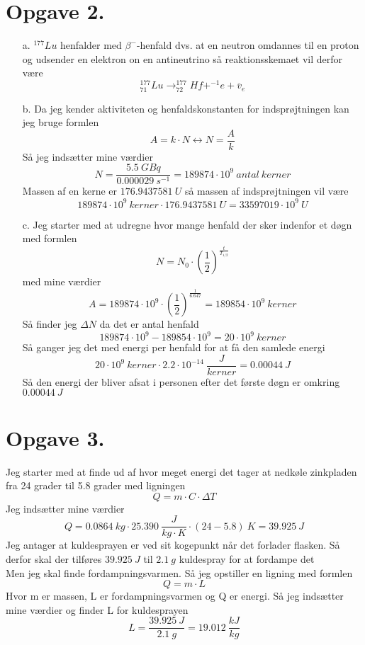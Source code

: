 \documentclass[12pt]{article}
\begin{document}
\section*{Opgave 2.}
\begin{enumerate}
  \item[a.] $^{177}Lu$ henfalder med $\beta ^{-}$-henfald dvs. at en neutron omdannes til en proton og udsender en elektron on en antineutrino
  så reaktionsskemaet vil derfor være
  $$_{71}^{177}Lu \rightarrow _{72}^{177}Hf + ^{-1}e + \overline{v}_{e}$$

  \item[b.] Da jeg kender aktiviteten og henfaldskonstanten for indsprøjtningen kan jeg bruge formlen
  $$A = k \cdot N \leftrightarrow N = \frac{A}{k}$$
  Så jeg indsætter mine værdier
  $$N = \frac{5.5 \ GBq}{0.000029 \ s^{-1}} = 189874 \cdot 10^{9} \ antal \ kerner$$
  Massen af en kerne er $176.9437581 \ U$ så massen af indsprøjtningen vil være
  $$189874 \cdot 10^{9} \ kerner \cdot 176.9437581 \ U = 33597019 \cdot 10^{9} \ U$$

  \item[c.] Jeg starter med at udregne hvor mange henfald der sker indenfor et døgn med formlen
  $$N = N_0 \cdot \left( \frac{1}{2} \right)^{\frac{t}{T_{1/2}}}$$
  med mine værdier
  $$A = 189874 \cdot 10^{9} \cdot \left( \frac{1}{2} \right)^{\frac{1}{6.647}} = 189854 \cdot 10^{9} \ kerner$$
  Så finder jeg $\Delta N$ da det er antal henfald
  $$189874 \cdot 10^{9} - 189854 \cdot 10^{9} = 20 \cdot 10^{9} \ kerner$$
  Så ganger jeg det med energi per henfald for at få den samlede energi
  $$20 \cdot 10^{9} \ kerner \cdot 2.2 \cdot 10^{-14} \ \frac{J}{kerner} = 0.00044 \ J$$
  Så den energi der bliver afsat i personen efter det første døgn er omkring $0.00044 \ J$
\end{enumerate}

\section*{Opgave 3.} Jeg starter med at finde ud af hvor meget energi det tager at nedkøle zinkpladen fra 24 grader til 5.8 grader med ligningen
$$Q=m \cdot C \cdot \Delta T$$
Jeg indsætter mine værdier
$$Q = 0.0864 \ kg \cdot 25.390 \ \frac{J}{kg \cdot K} \cdot (24-5.8) \ K = 39.925 \ J$$
Jeg antager at kuldesprayen er ved sit kogepunkt når det forlader flasken. Så derfor skal der tilføres $39.925 \ J$ til $2.1 \ g$ kuldespray for at fordampe det\\
Men jeg skal finde fordampningsvarmen. Så jeg opstiller en ligning med formlen
$$Q = m \cdot L$$
Hvor m er massen, L er fordampningsvarmen og Q er energi.
Så jeg indsætter mine værdier og finder L for kuldesprayen
$$L=\frac{39.925 \ J}{2.1 \ g} = 19.012 \ \frac{kJ}{kg}$$
\end{document}
